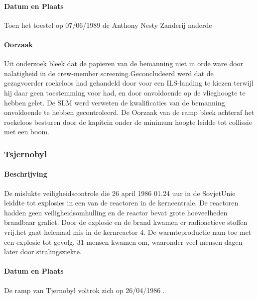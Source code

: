 \documentclass{article}
\begin{document}
	\paragraph{Datum en Plaats}
	Toen het toestel op 07/06/1989 de Anthony Nesty Zanderij naderde
	\paragraph{Oorzaak}
	\newline \indent
	
	Uit onderzoek bleek dat de papieren van de bemanning niet in orde ware door nalatigheid in de crew-member screening.Geconcludeerd werd dat de gezagvoerder roekeloos had gehandeld door voor een ILS-landing te kiezen terwijl hij daar geen toestemming voor had, en door onvoldoende op de vlieghoogte te hebben gelet. 
	De SLM werd verweten de kwalificaties van de bemanning onvoldoende te hebben gecontroleerd. De Oorzaak van de ramp bleek achteraf het roekeloos besturen door de kapitein onder de minimum hoogte leidde tot collissie met een boom.
	\subsubsection{Tsjernobyl}
	\paragraph{Beschrijving}
	De mislukte veiligheidscontrole die 26 april 1986 01.24 uur in de SovjetUnie leiddte tot explosies in een van de reactoren in de kerncentrale. De reactoren hadden geen veiligheidsomhulling en de reactor bevat grote hoeveelheden brandbaar grafiet. Door de explosie en de brand kwamen er radioactieve stoffen vrij.het gaat helemaal mis in de kernreactor 4. De warmteproductie nam  toe met een explosie tot gevolg. 31 mensen kwamen om, waaronder veel mensen dagen later door stralingsziekte.
	\paragraph{Datum en Plaats}
	De ramp van Tjernobyl voltrok zich op 26/04/1986 \cite{INSAVienna1992Chernobyl}.
\end{document}
